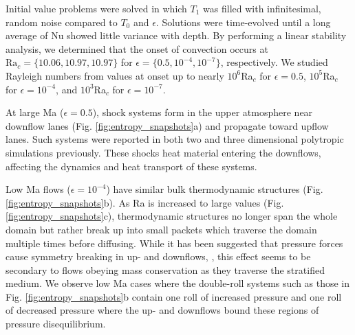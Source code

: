 \documentclass[aps, prl, twocolumn, nofootinbib, groupedaddress, amsfonts, amssymb, amsmath]{revtex4-1}
\begin{document}
Initial value problems were solved in which $T_1$ 
was filled with infinitesimal, random noise compared to $T_0$ and $\epsilon$.
Solutions were time-evolved until a long average of Nu showed little
variance with depth. By performing a linear stability analysis, we determined that the onset of convection
occurs at $\text{Ra}_c = \{10.06, 10.97, 10.97\}$ for $\epsilon = \{0.5, 10^{-4}, 10^{-7}\}$, respectively.  
We studied Rayleigh
numbers from values at onset up to nearly $10^6$Ra$_c$ for $\epsilon = 0.5$, $10^5$Ra$_c$ for $\epsilon = 10^{-4}$,
and $10^3$Ra$_c$ for $\epsilon = 10^{-7}$.

At large Ma ($\epsilon = 0.5$), shock systems form in the upper atmosphere near downflow lanes 
(Fig. \ref{fig:entropy_snapshots}a) and propagate toward upflow lanes.  
Such systems were reported in
both two \cite{cattaneo&all1990} and three \cite{malagoli&all1990} dimensional polytropic simulations previously.
These shocks heat material entering the downflows, affecting the dynamics and heat transport
of these systems.

Low Ma flows ($\epsilon = 10^{-4}$)
have similar bulk thermodynamic structures (Fig. \ref{fig:entropy_snapshots}b).
As Ra is increased to large values (Fig. \ref{fig:entropy_snapshots}c), thermodynamic structures 
no longer span the whole domain but rather break up into small packets which traverse the domain multiple
times before diffusing.  
While it has been suggested that pressure forces cause symmetry breaking in up- and downflows,
\cite{hurlburt&all1984}, this effect seems to be secondary to flows obeying mass conservation as they traverse
the stratified medium.  We observe low Ma cases where the double-roll systems such as those in
Fig. \ref{fig:entropy_snapshots}b contain one roll of increased pressure and one roll of decreased pressure
where the up- and downflows bound these regions of pressure disequilibrium.
\end{document}
